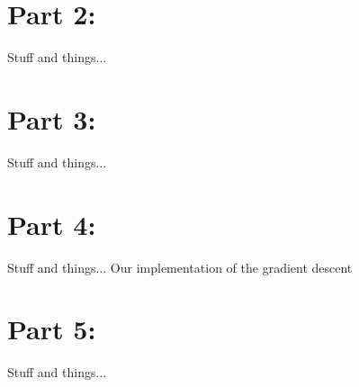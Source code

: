 \documentclass{article}
\begin{document}
\section*{Part 2:}
Stuff and things...


\section*{Part 3:}
Stuff and things...

\section*{Part 4:}
Stuff and things...
Our implementation of the gradient descent

\section*{Part 5:}
Stuff and things...
\end{document}
